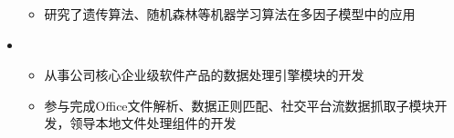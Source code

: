 \begin{itemize}[leftmargin=*]
{\begin{itemize}
        \item 研究了遗传算法、随机森林等机器学习算法在多因子模型中的应用
      \end{itemize}
      }
    \item
      {\small
      \begin{itemize}
        \item 从事公司核心企业级软件产品的数据处理引擎模块的开发
        \item 参与完成Office文件解析、数据正则匹配、社交平台流数据抓取子模块开发，领导本地文件处理组件的开发
      \end{itemize}
      }
  \end{itemize}
